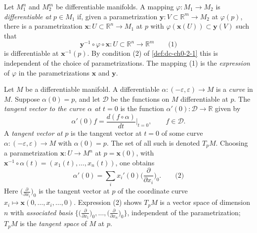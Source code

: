 \begin{definition}
  \label{def:dc-ch0-2-5}


  Let $M_1^n$ and $M_2^m$ be differentiable manifolds. A mapping
  $\varphi:M_1\to M_2$ is \emph{differentiable at} $p\in M_1$ if, given a parametrization
  $\mathbf{y}:V\subset\mathbb{R}^m\to M_2$ at $\varphi(p)$, there is a
  parametrization $\mathbf{x}:U\subset\mathbb{R}^n\to M_1$ at $p$ with
  $\varphi(\mathbf{x}(U))\subset\mathbf{y}(V)$ such that
  $$
  \mathbf{y}^{-1}\circ\varphi\circ\mathbf{x}:U\subset\mathbb{R}^n\to\mathbb{R}^m\qquad\text{(1)}
  $$
  is differentiable at $\mathbf{x}^{-1}(p)$. By condition (2) of \cref{def:dc-ch0-2-1}
  this is independent of the choice of parametrizations. The mapping (1) is the
  \emph{expression} of $\varphi$ in the parametrizations $\mathbf{x}$ and $\mathbf{y}$.
\end{definition}

\begin{definition}
  \label{def:dc-ch0-2-6}


  Let $M$ be a differentiable manifold. A differentiable
  $\alpha:(-\varepsilon,\varepsilon)\to M$ is a \emph{curve} in $M$. Suppose
  $\alpha(0)=p$, and let $\mathcal{D}$ be the functions on $M$ differentiable at
  $p$. The \emph{tangent vector to the curve $\alpha$ at $t=0$} is the function
  $\alpha'(0):\mathcal{D}\to\mathbb{R}$ given by
  $$
  \alpha'(0)f=\frac{d(f\circ\alpha)}{dt}\Big|_{t=0},\qquad f\in\mathcal{D}.
  $$
  A \emph{tangent vector at $p$} is the tangent vector at $t=0$ of some curve
  $\alpha:(-\varepsilon,\varepsilon)\to M$ with $\alpha(0)=p$. The set of all such
  is denoted $T_pM$. Choosing a parametrization $\mathbf{x}:U\to M^n$ at
  $p=\mathbf{x}(0)$, with $\mathbf{x}^{-1}\circ\alpha(t)=(x_1(t),\dots,x_n(t))$,
  one obtains
  $$
  \alpha'(0)=\sum_i x_i'(0)\Big(\frac{\partial}{\partial x_i}\Big)_0.\qquad\text{(2)}
  $$
  Here $\big(\frac{\partial}{\partial x_i}\big)_0$ is the tangent vector at $p$ of
  the coordinate curve $x_i\mapsto\mathbf{x}(0,\dots,x_i,\dots,0)$. Expression (2)
  shows $T_pM$ is a vector space of dimension $n$ with \emph{associated basis}
  $\big\{\big(\frac{\partial}{\partial x_1}\big)_0,\dots,\big(\frac{\partial}{\partial x_n}\big)_0\big\}$,
  independent of the parametrization; $T_pM$ is the \emph{tangent space} of $M$ at $p$.
\end{definition}

